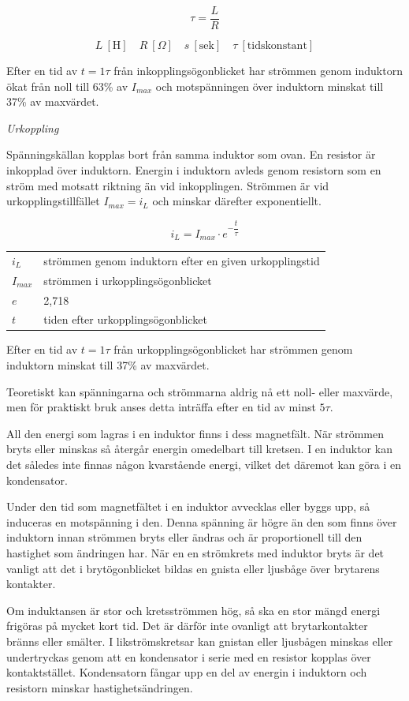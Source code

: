 \[\tau = \frac{L}{R}\]

\[
L\ [\text{H}] \quad
R\ [Ω] \quad
s\ [\text{sek}] \quad
\tau\ [\text{tidskonstant}]
\]

Efter en tid av \(t = 1\tau\) från inkopplingsögonblicket har strömmen genom
induktorn ökat från noll till 63\% av \(I_{max}\) och motspänningen över
induktorn minskat till 37\% av maxvärdet.

\emph{Urkoppling}

Spänningskällan kopplas bort från samma induktor som ovan. En resistor är
inkopplad över induktorn. Energin i induktorn avleds genom resistorn som en
ström med motsatt riktning än vid inkopplingen. Strömmen är vid
urkopplingstillfället \(I_{max} = i_L\) och minskar därefter exponentiellt.

\[i_L = I_{max} \cdot e^{-\dfrac{t}{\tau}}\]

\begin{tabular}{ll}
  \(i_L\) & strömmen genom induktorn efter en given urkopplingstid \\
  \(I_{max}\) & strömmen i urkopplingsögonblicket \\
  \(e\) & 2,718 \\
  \(t\) & tiden efter urkopplingsögonblicket \\
\end{tabular}

Efter en tid av \(t = 1\tau\) från urkopplingsögonblicket har strömmen genom
induktorn minskat till 37\% av maxvärdet.

Teoretiskt kan spänningarna och strömmarna aldrig nå ett noll- eller maxvärde,
men för praktiskt bruk anses detta inträffa efter en tid av minst \(5\tau\).

All den energi som lagras i en induktor finns i dess magnetfält. När strömmen
bryts eller minskas så återgår energin omedelbart till kretsen. I en induktor
kan det således inte finnas någon kvarstående energi, vilket det däremot kan
göra i en kondensator.

Under den tid som magnetfältet i en induktor avvecklas eller byggs upp, så
induceras en motspänning i den. Denna spänning är högre än den som finns över
induktorn innan strömmen bryts eller ändras och är proportionell till den
hastighet som ändringen har. När en en strömkrets med induktor
bryts är det vanligt att det i brytögonblicket bildas en gnista eller ljusbåge
över brytarens kontakter.

Om induktansen är stor och kretsströmmen hög, så ska en stor mängd energi
frigöras på mycket kort tid. Det är därför inte ovanligt att brytarkontakter
bränns eller smälter. I likströmskretsar kan gnistan eller ljusbågen minskas
eller undertryckas genom att en kondensator i serie med en resistor kopplas
över kontaktstället. Kondensatorn fångar upp en del av energin i induktorn och
resistorn minskar hastighetsändringen.

